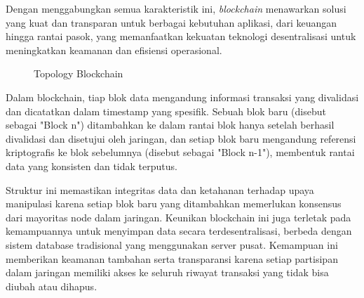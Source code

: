 Dengan menggabungkan semua karakteristik ini, \emph{blockchain} menawarkan solusi yang kuat dan transparan untuk berbagai kebutuhan aplikasi, dari keuangan hingga rantai pasok, yang memanfaatkan kekuatan teknologi desentralisasi untuk meningkatkan keamanan dan efisiensi operasional. \cite{Zheng2020}

    \begin{figure} [H] \centering
    \caption{Topology Blockchain \cite{Zheng2020}}
    \label{fig:blockchain}
    \end{figure}

    Dalam blockchain, tiap blok data mengandung informasi transaksi yang divalidasi dan dicatatkan dalam timestamp yang spesifik. Sebuah blok baru (disebut sebagai "Block n") ditambahkan ke dalam rantai blok hanya setelah berhasil divalidasi dan disetujui oleh jaringan, dan setiap blok baru mengandung referensi kriptografis ke blok sebelumnya (disebut sebagai "Block n-1"), membentuk rantai data yang konsisten dan tidak terputus.

    Struktur ini memastikan integritas data dan ketahanan terhadap upaya manipulasi karena setiap blok baru yang ditambahkan memerlukan konsensus dari mayoritas node dalam jaringan. Keunikan blockchain ini juga terletak pada kemampuannya untuk menyimpan data secara terdesentralisasi, berbeda dengan sistem database tradisional yang menggunakan server pusat. Kemampuan ini memberikan keamanan tambahan serta transparansi karena setiap partisipan dalam jaringan memiliki akses ke seluruh riwayat transaksi yang tidak bisa diubah atau dihapus.


